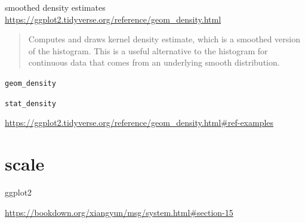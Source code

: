 \documentclass[
]{book}
\theoremstyle{definition}
\theoremstyle{definition}
\theoremstyle{definition}
\theoremstyle{definition}
\theoremstyle{remark}
\begin{document}
smoothed density estimates \url{https://ggplot2.tidyverse.org/reference/geom_density.html}

\begin{quote}
Computes and draws kernel density estimate, which is a smoothed version of the histogram. This is a useful alternative to the histogram for continuous data that comes from an underlying smooth distribution.
\end{quote}

\texttt{geom\_density}

\texttt{stat\_density}

\url{https://ggplot2.tidyverse.org/reference/geom_density.html\#ref-examples}

\section{scale}\label{scale}

ggplot2

\url{https://bookdown.org/xiangyun/msg/system.html\#section-15}
\end{document}
